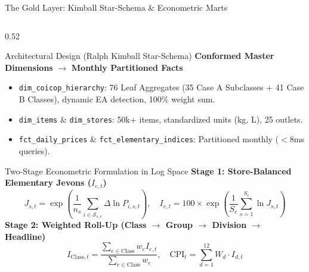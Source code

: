 \documentclass[aspectratio=169, 10pt]{beamer}
\begin{document}
\begin{frame}[shrink=8]{The Gold Layer: Kimball Star-Schema \& Econometric Marts}
  \begin{columns}
    \begin{column}{0.52\textwidth}
      \begin{block}{Architectural Design (Ralph Kimball Star-Schema)}
        \scriptsize
        \textbf{Conformed Master Dimensions} $\rightarrow$ \textbf{Monthly Partitioned Facts}
        \begin{itemize}
          \item \texttt{dim\_coicop\_hierarchy}: 76 Leaf Aggregates (35 Case A Subclasses + 41 Case B Classes), dynamic EA detection, 100\% weight sum.
          \item \texttt{dim\_items} \& \texttt{dim\_stores}: 50k+ items, standardized units (kg, L), 25 outlets.
          \item \texttt{fct\_daily\_prices} \& \texttt{fct\_elementary\_indices}: Partitioned monthly ($<$8ms queries).
        \end{itemize}
      \end{block}

      \begin{exampleblock}{Two-Stage Econometric Formulation in Log Space}
        \scriptsize
        \textbf{Stage 1: Store-Balanced Elementary Jevons ($I_{e,t}$)}
        \begin{equation*}
          J_{s,t} = \exp\left(\frac{1}{n_s} \sum_{i \in \mathcal{S}_{s,e}} \Delta \ln P_{i,s,t}\right), \quad I_{e,t} = 100 \times \exp\left(\frac{1}{S_e} \sum_{s=1}^{S_e} \ln J_{s,t}\right)
        \end{equation*}
        \textbf{Stage 2: Weighted Roll-Up (Class $\rightarrow$ Group $\rightarrow$ Division $\rightarrow$ Headline)}
        \begin{equation*}
          I_{\text{Class},t} = \frac{\sum_{e \in \text{Class}} w_e I_{e,t}}{\sum_{e \in \text{Class}} w_e}, \quad \text{CPI}_t = \sum_{d=1}^{12} W_d \cdot I_{d,t}
        \end{equation*}
      \end{exampleblock}
    \end{column}


\end{columns}
\end{frame}
\end{document}
